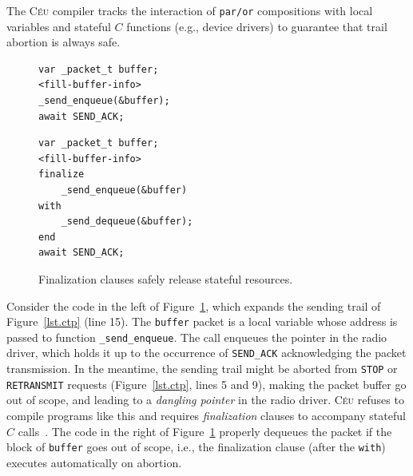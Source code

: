 \documentclass{acm_proc_article-sp}
\newcommand{\CEU}{\textsc{C\'{e}u}\xspace}
\newcommand{\code}[1] {{\small{\texttt{#1}}}}
\newcommand{\1}{\;}
\newcommand{\2}{\;\;}
\newcommand{\3}{\;\;\;}
\newcommand{\5}{\;\;\;\;\;}
\begin{document}

%
The \CEU compiler tracks the interaction of \code{par/or} compositions with 
local variables and stateful $C$ functions (e.g., device drivers) to guarantee 
that trail abortion is always safe.

\begin{figure}[t]
\begin{minipage}[t]{0.45\linewidth}
\begin{lstlisting}
var _packet_t buffer;
<fill-buffer-info>
_send_enqueue(&buffer);
await SEND_ACK;
\end{lstlisting}
\end{minipage}
%
\begin{minipage}[t]{0.50\linewidth}
\begin{lstlisting}
var _packet_t buffer;
<fill-buffer-info>
finalize
    _send_enqueue(&buffer)
with
    _send_dequeue(&buffer);
end
await SEND_ACK;
\end{lstlisting}
\end{minipage}
\caption{ Finalization clauses safely release stateful resources.
\label{lst.fin}
}
\end{figure}

Consider the code in the left of Figure~\ref{lst.fin}, which expands the 
sending trail of Figure~\ref{lst.ctp} (line 15).
%
The \code{buffer} packet is a local variable whose address is passed to 
function \code{\_send\_enqueue}.
The call enqueues the pointer in the radio driver, which holds it up to the 
occurrence of \code{SEND\_ACK} acknowledging the packet transmission.
%
In the meantime, the sending trail might be aborted from \code{STOP} or 
\code{RETRANSMIT} requests (Figure~\ref{lst.ctp}, lines 5 and 9), making the 
packet buffer go out of scope, and leading to a \emph{dangling pointer} in the 
radio driver.
%
\CEU refuses to compile programs like this and requires \emph{finalization} 
clauses to accompany stateful $C$ calls~\cite{ceu.sensys13}.
The code in the right of Figure~\ref{lst.fin} properly dequeues the packet if
the block of \code{buffer} goes out of scope, i.e., the finalization clause 
(after the \code{with}) executes automatically on abortion.
\end{document}
